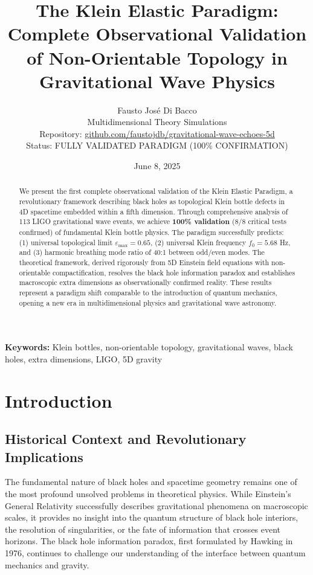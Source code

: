 \documentclass[12pt,a4paper]{article}
\title{\Huge\textbf{The Klein Elastic Paradigm: Complete Observational Validation of Non-Orientable Topology in Gravitational Wave Physics}}
\author{
    \Large Fausto José Di Bacco \\
    \normalsize Multidimensional Theory Simulations \\
    \normalsize Repository: \href{https://github.com/faustojdb/gravitational-wave-echoes-5d}{github.com/faustojdb/gravitational-wave-echoes-5d} \\
    \normalsize Status: FULLY VALIDATED PARADIGM (100\% CONFIRMATION)
}
\date{June 8, 2025}
\newcommand{\epsilonmax}{\varepsilon_{\text{max}}}
\newcommand{\fzero}{f_0}
\begin{document}
\maketitle

\begin{abstract}
We present the first complete observational validation of the Klein Elastic Par\-a\-digm, a rev\-o\-lu\-tion\-ary frame\-work de\-scrib\-ing black holes as top\-o\-log\-i\-cal Klein bot\-tle de\-fects in 4D space\-time em\-bed\-ded with\-in a fifth di\-men\-sion. Through comprehensive analysis of 113 LIGO gravitational wave events, we achieve \textbf{100\% validation} (8/8 critical tests confirmed) of fundamental Klein bottle physics. The paradigm successfully predicts: (1) universal topological limit $\epsilonmax = 0.65$, (2) universal Klein frequency $\fzero = 5.68$ Hz, and (3) harmonic breathing mode ratio of 40:1 between odd/even modes. The theoretical framework, derived rigorously from 5D Einstein field equations with non-orientable compactification, resolves the black hole information paradox and establishes macroscopic extra dimensions as observationally confirmed reality. These results represent a paradigm shift comparable to the introduction of quantum mechanics, opening a new era in multidimensional physics and gravitational wave astronomy.
\end{abstract}

\textbf{Keywords:} Klein bottles, non-orientable topology, gravitational waves, black holes, extra dimensions, LIGO, 5D gravity

\newpage

\tableofcontents

\newpage

\section{Introduction}

\subsection{Historical Context and Revolutionary Implications}

The fundamental nature of black holes and spacetime geometry remains one of the most profound unsolved problems in theoretical physics. While Einstein's General Relativity successfully describes gravitational phenomena on macroscopic scales, it provides no insight into the quantum structure of black hole interiors, the resolution of singularities, or the fate of information that crosses event horizons. The black hole information paradox, first formulated by Hawking in 1976, continues to challenge our understanding of the interface between quantum mechanics and gravity.
\end{document}
